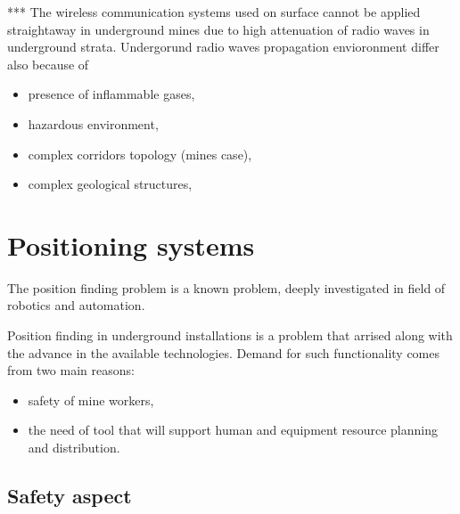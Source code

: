 \documentclass[../main.tex]{subfiles}
\begin{document}
***
The wireless communication systems used on surface cannot be applied straightaway in underground mines due to high attenuation of radio waves in underground strata. Undergorund radio waves propagation envioronment differ also because of
\begin{itemize}
	\item presence of inflammable gases,
	\item hazardous environment,
	\item complex corridors topology (mines case),
	\item complex geological structures,
\end{itemize}


\section{Positioning systems}

The position finding problem is a known problem, deeply investigated in field of robotics and automation. \cite{discover_beacons_and_position}

Position finding in underground installations is a problem that arrised along with the advance in the available technologies. Demand for such functionality comes from two main reasons:
\begin{itemize}
	\item safety of mine workers,
	\item the need of tool that will support human and equipment resource planning and distribution.
\end{itemize}

\subsection{Safety aspect} %
\label{sub:safety_aspect}
\end{document}
